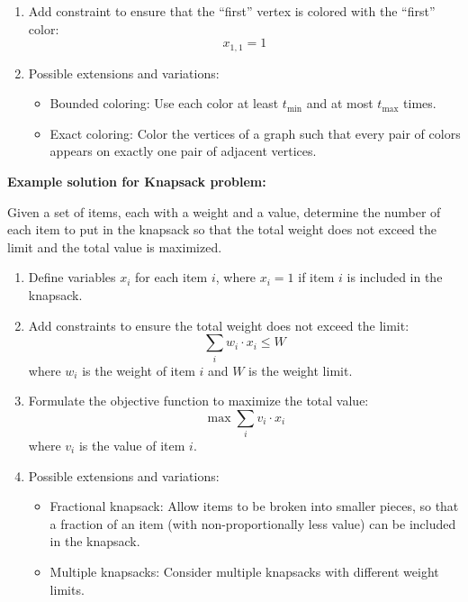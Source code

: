 \documentclass[a4paper,12pt]{article}
\begin{document}
\begin{tasks}
\begin{enumerate}
        \item Add constraint to ensure that the \enquote{first} vertex is colored with the \enquote{first} color:
        \[
            x_{1,1} = 1
        \]

        \item Possible extensions and variations:
        \begin{itemize}[left=0pt]
            \item Bounded coloring: Use each color at least $t_{\min}$ and at most $t_{\max}$ times.
            \item Exact coloring: Color the vertices of a graph such that every pair of colors appears on exactly one pair of adjacent vertices.
        \end{itemize}
    \end{enumerate}

    \medskip
    \textbf{Example solution for Knapsack problem:}

    Given a set of items, each with a weight and a value, determine the number of each item to put in the knapsack so that the total weight does not exceed the limit and the total value is maximized.

    \begin{enumerate}
        \item Define variables $x_i$ for each item $i$, where $x_i = 1$ if item $i$ is included in the knapsack.

        \item Add constraints to ensure the total weight does not exceed the limit:
        \[
            \sum_{i} w_i \cdot x_i \leq W
        \]
        where $w_i$ is the weight of item $i$ and $W$ is the weight limit.

        \item Formulate the objective function to maximize the total value:
        \[
            \max \sum_{i} v_i \cdot x_i
        \]
        where $v_i$ is the value of item $i$.

        \item Possible extensions and variations:
        \begin{itemize}[left=0pt]
            \item Fractional knapsack: Allow items to be broken into smaller pieces, so that a fraction of an item (with non-proportionally less value) can be included in the knapsack.
            \item Multiple knapsacks: Consider multiple knapsacks with different weight limits.
        \end{itemize}
    \end{enumerate}

\end{tasks}
\end{document}
